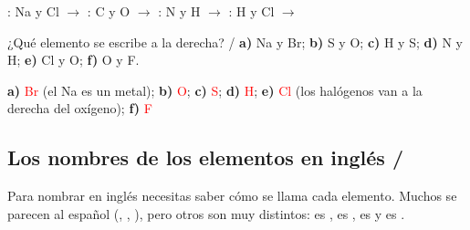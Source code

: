 \ejemplos
{} : Na y Cl \(\to\)  \quad {} : C y O \(\to\)  \quad {} : N y H \(\to\)  \quad {} : H y Cl \(\to\) 

\begin{exercise}
    ¿Qué elemento se escribe a la derecha? /  \textbf{a)} Na y Br; \textbf{b)} S y O; \textbf{c)} H y S; \textbf{d)} N y H; \textbf{e)} Cl y O; \textbf{f)} O y F.
    \begin{solu}
        \textbf{a)} \textcolor{red}{Br} (el Na es un metal); \textbf{b)} \textcolor{red}{O}; \textbf{c)} \textcolor{red}{S}; \textbf{d)} \textcolor{red}{H}; \textbf{e)} \textcolor{red}{Cl} (los halógenos van a la derecha del oxígeno); \textbf{f)} \textcolor{red}{F}
    \end{solu}
\end{exercise}

\subsection{Los nombres de los elementos en inglés / }

Para nombrar en inglés necesitas saber cómo se llama cada elemento. Muchos se parecen al español (, , ), pero otros son muy distintos:  es ,  es ,  es  y  es .

